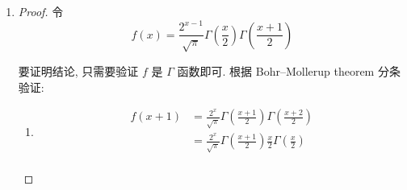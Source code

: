 \documentclass{article}
\begin{document}
\begin{enumerate}
\begin{proof}
        又易验证, $n=0$ 时, $\frac{\Gamma(n+\alpha)}{n!\Gamma(\alpha)}x^n=1$ ,
        接下来只需证: \begin{equation}
            \begin{aligned}
                \frac{\Gamma(n+\alpha)}{\Gamma(\alpha)}
                &=(-\alpha)(-\alpha-1)\dots(-\alpha-n+1)(-1)^n \\
                &=\alpha(\alpha+1)\dots(\alpha+n-1) \\
            \end{aligned}
            \nonumber
        \end{equation} \par
        考虑 $\Gamma$ 函数的性质: $\Gamma(x+1)=x\Gamma(x)$ , 有: \begin{equation}
            \begin{aligned}
                \frac{\Gamma(n+\alpha)}{\Gamma(\alpha)}
                &=\frac{(n-1+\alpha)\Gamma(n-1+\alpha)}{\Gamma(\alpha)} \\
                &=\dots \\
                &=\frac{(n-1+\alpha)(n-2+\alpha)\dots\alpha\Gamma(\alpha)}{\Gamma(\alpha)} \\
                &=(n-1+\alpha)(n-2+\alpha)\dots\alpha \\
            \end{aligned}
            \nonumber
        \end{equation} \par
        得证.
    \end{proof}
    \item \begin{proof}
        令 \begin{equation}
            f(x)=\frac{2^{x-1}}{\sqrt{\pi}}\Gamma\left(\frac{x}{2}\right)\Gamma\left(\frac{x+1}{2}\right)
            \nonumber
        \end{equation} \par
        要证明结论, 只需要验证 $f$ 是 $\Gamma$ 函数即可. 根据 Bohr–Mollerup theorem 分条验证: \par
        \begin{enumerate}
            \item \begin{equation}
                \begin{aligned}
                    f(x+1)
                    &=\frac{2^x}{\sqrt{\pi}}\Gamma\left(\frac{x+1}{2}\right)\Gamma\left(\frac{x+2}{2}\right) \\
                    &=\frac{2^x}{\sqrt{\pi}}\Gamma\left(\frac{x+1}{2}\right)\frac{x}{2}\Gamma\left(\frac{x}{2}\right) \\

\end{aligned}
\end{equation}
\end{enumerate}
\end{proof}
\end{enumerate}
\end{document}
